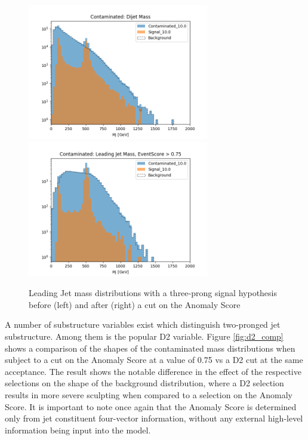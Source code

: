 \documentclass[12pt, a4paper]{article}
\begin{document}
\begin{figure}[H]
	\begin{center}
		\includegraphics[width=225pt]{imgs/3Prong_Contaminated_10p0_J_Mass_Multi.png}
		\includegraphics[width=225pt]{imgs/3Prong_Contaminated_10p0_J_Mass_EventScore0p75_Multi.png}
	\end{center}
	\caption{Leading Jet mass distributions with a three-prong signal hypothesis before (left) and after (right) a cut on the Anomaly Score}
	\label{fig:3P_lj_mass}
\end{figure}




A number of substructure variables exist which distinguish two-pronged jet substructure. Among them is the popular D2 variable. Figure \ref{fig:d2_comp} shows a comparison of the shapes of the contaminated mass distributions when subject to a cut on the Anomaly Score at a value of 0.75 vs a D2 cut at the same acceptance. The result shows the notable difference in the effect of the respective selections on the shape of the background distribution, where a D2 selection results in more severe sculpting when compared to a selection on the Anomaly Score. It is important to note once again that the Anomaly Score is determined only from jet constituent four-vector information, without any external high-level information being input into the model.
\end{document}
